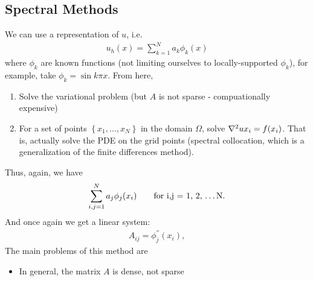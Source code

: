 \documentclass{article}
\begin{document}
            \subsection{Spectral Methods}
                We can use a representation of $u$, i.e.
                \begin{align}
                    u_h(x) = \sum_{k=1}^N a_k \phi_k(x)
                \end{align}
                where $\phi_k$ are known functions (not limiting ourselves to locally-supported $\phi_k$), for example, take $\phi_k = \sin k\pi x$.  From here,
                \begin{enumerate}[\ \ 1)]
                    \item Solve the variational problem (but $A$ is not sparse - compuationally expensive)
                    \item For a set of points $\left\{x_1,\dots, x_N\right\}$ in the domain $\Omega$, solve $\laplacian u x_i = f(x_i)$.  That is, actually solve the PDE on the grid points (spectral collocation, which is a generalization of the finite differences method).
                \end{enumerate}
                Thus, again, we have
                \begin{align}
                    \sum_{i,j=1}^N a_j \phi_j(x_i) \qquad \text{for i,j = 1, 2, \dots N.}
                \end{align}
                And once again we get a linear system:
                \begin{align}
                    A_{ij} = \phi_j^{''}(x_i),
                \end{align}
                The main problems of this method are
                \begin{itemize}
                    \item In general, the matrix $A$ is dense, not sparse
                \end{itemize}
\end{document}
